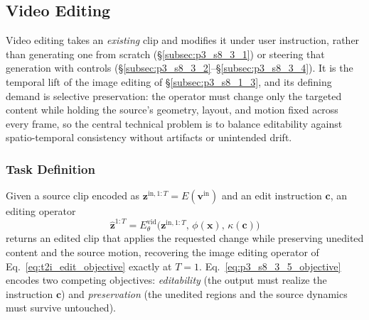 \subsection{Video Editing}
\label{subsec:p3_s8_3_5}

Video editing takes an \emph{existing} clip and modifies it under user instruction, rather than generating one from scratch (§\ref{subsec:p3_s8_3_1}) or steering that generation with controls (§\ref{subsec:p3_s8_3_2}--§\ref{subsec:p3_s8_3_4}). It is the temporal lift of the image editing of §\ref{subsec:p3_s8_1_3}, and its defining demand is selective preservation: the operator must change only the targeted content while holding the source's geometry, layout, and motion fixed across every frame, so the central technical problem is to balance editability against spatio-temporal consistency without artifacts or unintended drift.

\subsubsection{Task Definition}
\label{subsubsec:p3_s8_3_5_task}
Given a source clip encoded as $\mathbf{z}^{\text{in},1:T}=E(\mathbf{v}^{\text{in}})$ and an edit instruction $\mathbf{c}$, an editing operator
\begin{equation}
\hat{\mathbf{z}}^{1:T}=E_\theta^{\text{vid}}\!\big(\mathbf{z}^{\text{in},1:T},\,\phi(\mathbf{x}),\,\kappa(\mathbf{c})\big)
\label{eq:p3_s8_3_5_objective}
\end{equation}
returns an edited clip that applies the requested change while preserving unedited content and the source motion, recovering the image editing operator of Eq.~\eqref{eq:t2i_edit_objective} exactly at $T=1$. Eq.~\eqref{eq:p3_s8_3_5_objective} encodes two competing objectives: \emph{editability} (the output must realize the instruction $\mathbf{c}$) and \emph{preservation} (the unedited regions and the source dynamics must survive untouched).

